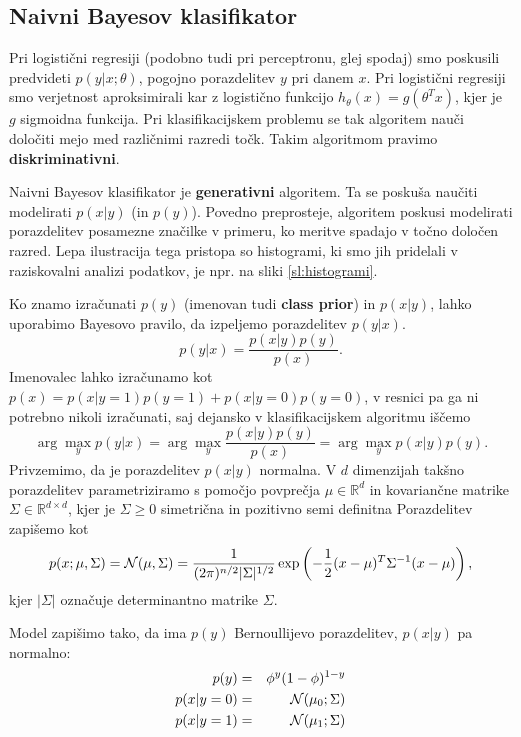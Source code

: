 \documentclass[11pt,a4paper,openany]{book}
\begin{document}
\subsection{Naivni Bayesov klasifikator}


Pri logistični regresiji (podobno tudi pri perceptronu, glej spodaj) smo poskusili predvideti $p(y|x;\theta)$, pogojno porazdelitev $y$ pri danem $x$. Pri logistični regresiji smo verjetnost aproksimirali kar z logistično funkcijo $h_\theta(x) = g(\theta^Tx)$, kjer je $g$ sigmoidna funkcija. Pri klasifikacijskem problemu se tak algoritem nauči določiti mejo med različnimi razredi točk. Takim algoritmom pravimo \textbf{diskriminativni}.

Naivni Bayesov klasifikator je \textbf{generativni} algoritem. Ta se poskuša naučiti modelirati $p(x|y)$ (in $p(y)$). Povedno preprosteje, algoritem poskusi modelirati porazdelitev posamezne značilke v primeru, ko meritve spadajo v točno določen razred. Lepa ilustracija tega pristopa so histogrami, ki smo jih pridelali v raziskovalni analizi podatkov, je npr. na sliki \ref{sl:histogrami}.

Ko znamo izračunati $p(y)$ (imenovan tudi \textbf{class prior}) in $p(x|y)$, lahko uporabimo Bayesovo pravilo, da izpeljemo porazdelitev $p(y|x)$.
\begin{equation}
	p(y|x) = \frac{p(x|y)p(y)}{p(x)}.
\end{equation}
Imenovalec lahko izračunamo kot $p(x) = p(x|y = 1)p(y = 1) + p(x|y = 0)p(y = 0)$, v resnici pa ga ni potrebno nikoli izračunati, saj dejansko v klasifikacijskem algoritmu iščemo
\begin{equation}
	\arg \max_y p(y|x) = \arg \max_y \frac{p(x|y)p(y)}{p(x)} = \arg \max_y p(x|y)p(y).
\end{equation}
Privzemimo, da je porazdelitev $p(x|y)$ normalna. V $d$ dimenzijah takšno porazdelitev parametriziramo s pomočjo povprečja $\mu \in \mathbb{R}^d$ in kovariančne matrike $\Sigma \in \mathbb{R}^{d \times d}$, kjer je $\Sigma \geq 0$ simetrična in pozitivno semi definitna Porazdelitev zapišemo kot
\begin{equation}
	p(x;\mu,\Sigma) = {\cal N}(\mu,\Sigma) = \frac{1}{(2\pi)^{n/2}|\Sigma|^{1/2}} \exp \left(-\frac{1}{2}(x - \mu)^T\Sigma^{-1}(x - \mu)\right),
\end{equation}
kjer $|\Sigma|$ označuje determinantno matrike $\Sigma$.

Model zapišimo tako, da ima $p(y)$ Bernoullijevo porazdelitev, $p(x|y)$ pa normalno:
\begin{eqnarray}
	p(y) &=& \phi^y(1-\phi)^{1-y} \\
	p(x|y = 0) &=& {\cal N}(\mu_0;\Sigma) \\
	p(x|y = 1) &=& {\cal N}(\mu_1;\Sigma)
\end{eqnarray}
\end{document}
